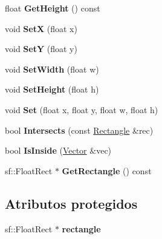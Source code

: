 \begin{DoxyCompactItemize}
\item 
\hypertarget{classRectangle_a3da1c0010c132fab5724d1233d34f4be}{float {\bfseries Get\-Height} () const }\label{classRectangle_a3da1c0010c132fab5724d1233d34f4be}

\item 
\hypertarget{classRectangle_ad78b74643d71995aa186560295a46ab1}{void {\bfseries Set\-X} (float x)}\label{classRectangle_ad78b74643d71995aa186560295a46ab1}

\item 
\hypertarget{classRectangle_a6cbb0d2df0c694f8da3dd29c962347c9}{void {\bfseries Set\-Y} (float y)}\label{classRectangle_a6cbb0d2df0c694f8da3dd29c962347c9}

\item 
\hypertarget{classRectangle_aebfe60964fa3eeb8d8c1077e17fafc2d}{void {\bfseries Set\-Width} (float w)}\label{classRectangle_aebfe60964fa3eeb8d8c1077e17fafc2d}

\item 
\hypertarget{classRectangle_a6b3191ad8cb3f28015628541161a198d}{void {\bfseries Set\-Height} (float h)}\label{classRectangle_a6b3191ad8cb3f28015628541161a198d}

\item 
\hypertarget{classRectangle_ae63b84fe454f93c5ad1f91a7a51cb1fd}{void {\bfseries Set} (float x, float y, float w, float h)}\label{classRectangle_ae63b84fe454f93c5ad1f91a7a51cb1fd}

\item 
\hypertarget{classRectangle_aa13667e689c7f898bea3533a7f240895}{bool {\bfseries Intersects} (const \hyperlink{classRectangle}{Rectangle} \&rec)}\label{classRectangle_aa13667e689c7f898bea3533a7f240895}

\item 
\hypertarget{classRectangle_a8a4a83fe36fc10ff8611be3cf0b62fd9}{bool {\bfseries Is\-Inside} (\hyperlink{classVector}{Vector} \&vec)}\label{classRectangle_a8a4a83fe36fc10ff8611be3cf0b62fd9}

\item 
\hypertarget{classRectangle_a230df1f21614d17998dc70cd7cdd2972}{sf\-::\-Float\-Rect $\ast$ {\bfseries Get\-Rectangle} () const }\label{classRectangle_a230df1f21614d17998dc70cd7cdd2972}

\end{DoxyCompactItemize}
\subsection*{Atributos protegidos}
\begin{DoxyCompactItemize}
\item 
\hypertarget{classRectangle_a36d4b0c079fb5bad16e819b6dd9ae5ad}{sf\-::\-Float\-Rect $\ast$ {\bfseries rectangle}}\label{classRectangle_a36d4b0c079fb5bad16e819b6dd9ae5ad}

\end{DoxyCompactItemize}



